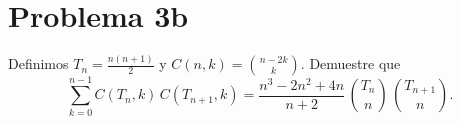 \section*{Problema 3b}
Definimos \(T_n = \tfrac{n(n+1)}{2}\) y \(C(n,k)=\binom{n-2k}{k}\). Demuestre que
\[\sum_{k=0}^{n-1} C(T_n,k)\,C(T_{n+1},k)
  = \frac{n^3 - 2n^2 + 4n}{n+2}\,
    \binom{T_n}{n}\,\binom{T_{n+1}}{n}.\]
